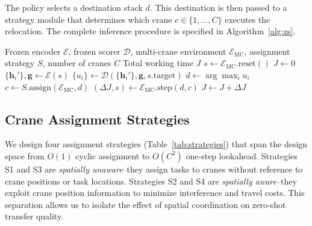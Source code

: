 The policy selects a destination stack $d$. This destination is then passed to a strategy module that determines which crane $c \in \{1, \dots, C\}$ executes the relocation. The complete inference procedure is specified in Algorithm~\ref{alg:zs}.

\begin{algorithm}[h!]
    \caption{Zero-shot M-CRP inference procedure. The frozen encoder and scorer select a destination stack; the strategy module assigns a crane; the multi-crane environment executes the action and returns the updated state.}
    \label{alg:zs}
    \begin{algorithmic}[1]
        \Require Frozen encoder $\mathcal{E}$, frozen scorer $\mathcal{D}$, multi-crane environment $\mathcal{E}_{\text{MC}}$, assignment strategy $S$, number of cranes $C$
        \Ensure Total working time $J$
        \State $s \gets \mathcal{E}_{\text{MC}}.\text{reset}()$
        \State $J \gets 0$
            \State $\{\mathbf{h}_i'\}, \mathbf{g} \gets \mathcal{E}(s)$ 
            \State $\{u_i\} \gets \mathcal{D}(\{\mathbf{h}_i'\}, \mathbf{g}, s.\text{target})$ 
            \State $d \gets \arg\max_i u_i$ 
            \State $c \gets S.\text{assign}(\mathcal{E}_{\text{MC}}, d)$ 
            \State $(\Delta J, s) \gets \mathcal{E}_{\text{MC}}.\text{step}(d, c)$ 
            \State $J \gets J + \Delta J$
        \EndWhile
    \end{algorithmic}
\end{algorithm}

\subsection{Crane Assignment Strategies}
\label{sec:strategies}

We design four assignment strategies (Table~\ref{tab:strategies}) that span the design space from $O(1)$ cyclic assignment to $O(C^2)$ one-step lookahead. Strategies S1 and S3 are \emph{spatially unaware}--they assign tasks to cranes without reference to crane positions or task locations. Strategies S2 and S4 are \emph{spatially aware}--they exploit crane position information to minimize interference and travel costs. This separation allows us to isolate the effect of spatial coordination on zero-shot transfer quality.

